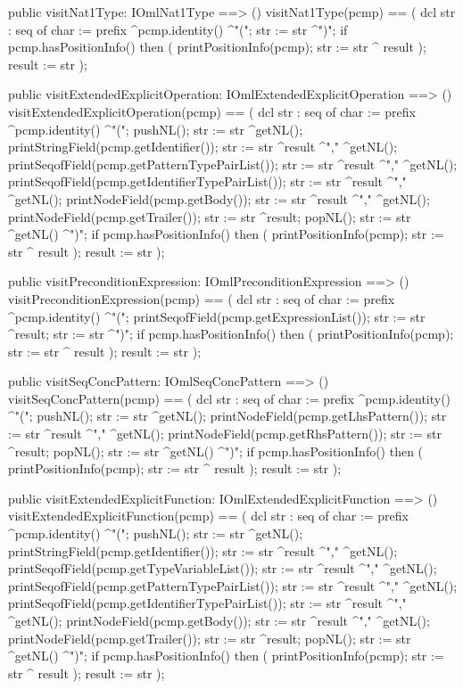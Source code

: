 \begin{vdm_al}
  public visitNat1Type: IOmlNat1Type ==> ()
  visitNat1Type(pcmp) ==
    ( dcl str : seq of char := prefix ^pcmp.identity() ^"(";
      str := str ^")";
      if pcmp.hasPositionInfo()
      then ( printPositionInfo(pcmp);
             str := str ^ result );
      result := str );

  public visitExtendedExplicitOperation: IOmlExtendedExplicitOperation ==> ()
  visitExtendedExplicitOperation(pcmp) ==
    ( dcl str : seq of char := prefix ^pcmp.identity() ^"(";
      pushNL();
      str := str ^getNL();
      printStringField(pcmp.getIdentifier());
      str := str ^result ^"," ^getNL();
      printSeqofField(pcmp.getPatternTypePairList());
      str := str ^result ^"," ^getNL();
      printSeqofField(pcmp.getIdentifierTypePairList());
      str := str ^result ^"," ^getNL();
      printNodeField(pcmp.getBody());
      str := str ^result ^"," ^getNL();
      printNodeField(pcmp.getTrailer());
      str := str ^result;
      popNL();
      str := str ^getNL() ^")";
      if pcmp.hasPositionInfo()
      then ( printPositionInfo(pcmp);
             str := str ^ result );
      result := str );

  public visitPreconditionExpression: IOmlPreconditionExpression ==> ()
  visitPreconditionExpression(pcmp) ==
    ( dcl str : seq of char := prefix ^pcmp.identity() ^"(";
      printSeqofField(pcmp.getExpressionList());
      str := str ^result;
      str := str ^")";
      if pcmp.hasPositionInfo()
      then ( printPositionInfo(pcmp);
             str := str ^ result );
      result := str );

  public visitSeqConcPattern: IOmlSeqConcPattern ==> ()
  visitSeqConcPattern(pcmp) ==
    ( dcl str : seq of char := prefix ^pcmp.identity() ^"(";
      pushNL();
      str := str ^getNL();
      printNodeField(pcmp.getLhsPattern());
      str := str ^result ^"," ^getNL();
      printNodeField(pcmp.getRhsPattern());
      str := str ^result;
      popNL();
      str := str ^getNL() ^")";
      if pcmp.hasPositionInfo()
      then ( printPositionInfo(pcmp);
             str := str ^ result );
      result := str );

  public visitExtendedExplicitFunction: IOmlExtendedExplicitFunction ==> ()
  visitExtendedExplicitFunction(pcmp) ==
    ( dcl str : seq of char := prefix ^pcmp.identity() ^"(";
      pushNL();
      str := str ^getNL();
      printStringField(pcmp.getIdentifier());
      str := str ^result ^"," ^getNL();
      printSeqofField(pcmp.getTypeVariableList());
      str := str ^result ^"," ^getNL();
      printSeqofField(pcmp.getPatternTypePairList());
      str := str ^result ^"," ^getNL();
      printSeqofField(pcmp.getIdentifierTypePairList());
      str := str ^result ^"," ^getNL();
      printNodeField(pcmp.getBody());
      str := str ^result ^"," ^getNL();
      printNodeField(pcmp.getTrailer());
      str := str ^result;
      popNL();
      str := str ^getNL() ^")";
      if pcmp.hasPositionInfo()
      then ( printPositionInfo(pcmp);
             str := str ^ result );
      result := str );


\end{vdm_al}
